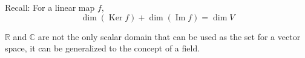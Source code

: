 \documentclass[letterpaper,12pt]{article}
\theoremstyle{definition}
\DeclareMathOperator{\Ker}{Ker}
\DeclareMathOperator{\Image}{Im}
\begin{document}
Recall: For a linear map $f$,
\begin{equation*}
    \dim{(\Ker{f})} + \dim{(\Image{f})} = \dim{V}
\end{equation*}

$\mathbb{R}$ and $\mathbb{C}$ are not the only scalar domain that can be used as the set for a vector space, it can be generalized to the concept of a field.
\end{document}
